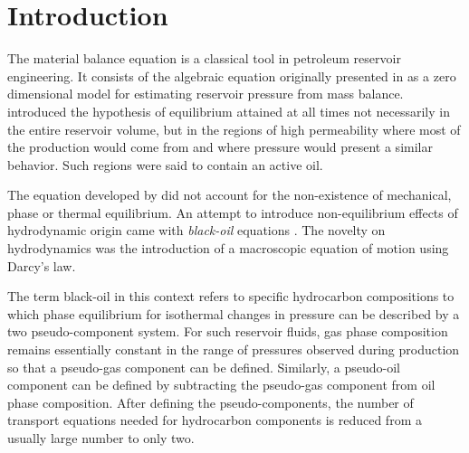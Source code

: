 \documentclass[authoryear,preprint,review,11pt]{elsarticle}
\begin{document}
\section{Introduction}
The material balance equation is a classical tool in petroleum reservoir engineering. It consists of the algebraic equation originally presented in \cite{schilthuis1936active} as a zero dimensional model for estimating reservoir pressure from mass balance. \cite{schilthuis1936active} introduced the hypothesis of equilibrium attained at all times not necessarily in the entire reservoir volume, but in the regions of high permeability where most of the production would come from and where pressure would present a similar behavior. Such regions were said to contain an active oil.

The equation developed by \cite{schilthuis1936active} did not account for the non-existence of mechanical, phase or thermal equilibrium. An attempt to introduce non-equilibrium effects of hydrodynamic origin came with \textit{black-oil} equations \citep{aziz1979petroleum,blackoil}. The novelty on hydrodynamics was the introduction of a macroscopic equation of motion using Darcy's law. 


The term black-oil in this context refers to specific hydrocarbon compositions to which phase equilibrium for isothermal changes in pressure can be described by a two pseudo-component system. For such reservoir fluids, gas phase composition remains essentially constant in the range of pressures observed during production so that a pseudo-gas component can be defined. Similarly, a pseudo-oil component can be defined by subtracting the pseudo-gas component from oil phase composition. After defining the pseudo-components, the number of transport equations needed for hydrocarbon components is reduced from a usually large number to only two.


\end{document}
